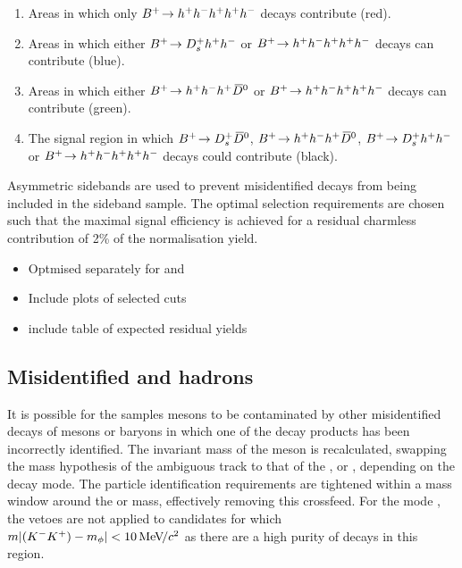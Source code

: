 \begin{enumerate}
\item Areas in which only ${{{B}^+}}\!\rightarrow h^{+}h^{-}h^{+}h^{+}h^{-}$ decays contribute (red).
\item Areas in which either ${{{B}^+}}\!\rightarrow D_{s}^{+}h^{+}h^{-}$  or ${{{B}^+}}\!\rightarrow h^{+}h^{-}h^{+} h^{+}h^{-}$ decays can contribute (blue). 

\item Areas in which either ${{{B}^+}}\!\rightarrow h^{+}h^{-}h^{+}{{\kern 0.2em\overline{\kern -0.2em D}{}}{}^0}$ or ${{{B}^+}}\!\rightarrow h^{+}h^{-}h^{+} h^{+}h^{-}$ decays can contribute (green). 
\item The signal region in which ${{{B}^+}}\!\rightarrow D_{s}^{+} {{\kern 0.2em\overline{\kern -0.2em D}{}}{}^0}$, ${{{B}^+}}\!\rightarrow h^{+}h^{-}h^{+}{{\kern 0.2em\overline{\kern -0.2em D}{}}{}^0}$, ${{{B}^+}}\!\rightarrow D_{s}^{+}h^{+}h^{-}$ or ${{{B}^+}}\!\rightarrow h^{+}h^{-}h^{+}h^{+}h^{-}$ decays could contribute (black).
\end{enumerate}   

Asymmetric \Dzb sidebands are used to prevent misidentified \decay{\Bp}{\Dsp (\decay{\Dzb}{\Km\pip})} decays from being included in the sideband sample.
The optimal selection requirements are chosen such that the maximal signal efficiency is achieved for a residual charmless contribution of 2\% of the normalisation yield.


{\color{Red}
\begin{itemize}
\item Optmised separately for \decay{\Bp}{\Dsp\Kp\Km} and \decay{\Bp}{\Dsp\phiz}
\item Include plots of selected cuts
\item include table of expected residual yields 
\end{itemize}
}


\subsection{Misidentified \D and \Lc hadrons}
\label{sec:pidvetos}

It is possible for the samples \Dsp mesons to be contaminated by other misidentified decays of \Dp mesons or \Lc baryons in which one of the decay products has been incorrectly identified.
The invariant mass of the \Dsp meson is recalculated, swapping the mass hypothesis of the ambiguous track to that of the \kaon, \pion or \proton, depending on the decay mode. 
The particle identification requirements are tightened within a mass window around the \Dp or \Lc mass, effectively removing this crossfeed. For the mode \decay{\Dsp}{\Kp\Km\pip}, the vetoes are not applied to candidates for which $m|({{K}^-}{{K}^+})-m_{\phi}| < 10{\mathrm{\,Me\kern -0.1em V\!/}c^2}$ as there are a high purity of \decay{\Dsp}{\Kp\Km\pip} decays in this region.

